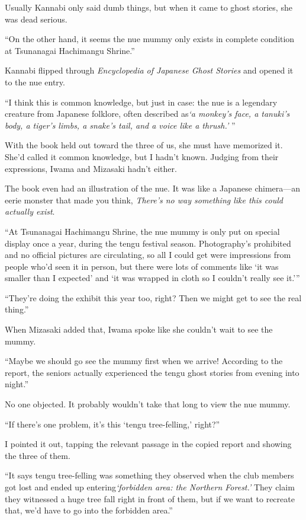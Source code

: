 \documentclass[
    a4paper,
    12pt,
    twoside,
    openany,
    UTF8,
    fontset=windows
]{ctexbook}
\begin{document}
Usually Kannabi only said dumb things, but when it came to ghost stories, she was dead serious.

``On the other hand, it seems the nue mummy only exists in complete condition at Tsunanagai Hachimangu Shrine.''

Kannabi flipped through \textit{Encyclopedia of Japanese Ghost Stories} and opened it to the nue entry.

``I think this is common knowledge, but just in case: the nue is a legendary creature from Japanese folklore, often described as\textit{`a monkey's face, a tanuki's body, a tiger's limbs, a snake's tail, and a voice like a thrush.'} ''

With the book held out toward the three of us, she must have memorized it. She'd called it common knowledge, but I hadn't known. Judging from their expressions, Iwama and Mizasaki hadn't either.

The book even had an illustration of the nue. It was like a Japanese chimera---an eerie monster that made you think, \textit{There's no way something like this could actually exist}.

``At Tsunanagai Hachimangu Shrine, the nue mummy is only put on special display once a year, during the tengu festival season. Photography's prohibited and no official pictures are circulating, so all I could get were impressions from people who'd seen it in person, but there were lots of comments like `it was smaller than I expected' and `it was wrapped in cloth so I couldn't really see it.'''

``They're doing the exhibit this year too, right? Then we might get to see the real thing.''

When Mizasaki added that, Iwama spoke like she couldn't wait to see the mummy.

``Maybe we should go see the mummy first when we arrive! According to the report, the seniors actually experienced the tengu ghost stories from evening into night.''

No one objected. It probably wouldn't take that long to view the nue mummy.

``If there's one problem, it's this `tengu tree-felling,' right?''

I pointed it out, tapping the relevant passage in the copied report and showing the three of them.

``It says tengu tree-felling was something they observed when the club members got lost and ended up entering\textit{`forbidden area: the Northern Forest.'} They claim they witnessed a huge tree fall right in front of them, but if we want to recreate that, we'd have to go into the forbidden area.''
\end{document}
